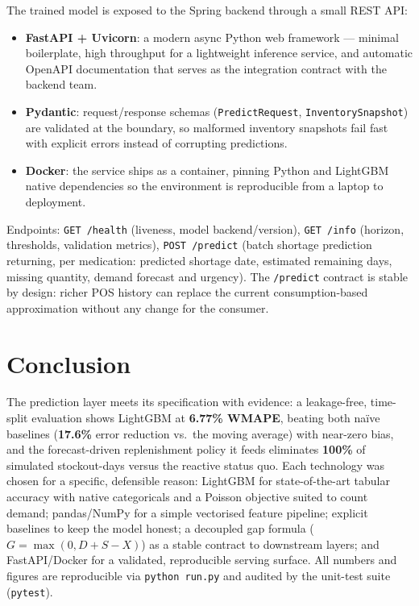 \documentclass[11pt,a4paper]{article}
\begin{document}
The trained model is exposed to the Spring backend through a small REST API:
\begin{itemize}
  \item \textbf{FastAPI + Uvicorn}: a modern async Python web framework --- minimal boilerplate, high throughput for a lightweight inference service, and automatic OpenAPI documentation that serves as the integration contract with the backend team.
  \item \textbf{Pydantic}: request/response schemas (\texttt{PredictRequest}, \texttt{InventorySnapshot}) are validated at the boundary, so malformed inventory snapshots fail fast with explicit errors instead of corrupting predictions.
  \item \textbf{Docker}: the service ships as a container, pinning Python and LightGBM native dependencies so the environment is reproducible from a laptop to deployment.
\end{itemize}
Endpoints: \texttt{GET /health} (liveness, model backend/version), \texttt{GET /info} (horizon, thresholds, validation metrics), \texttt{POST /predict} (batch shortage prediction returning, per medication: predicted shortage date, estimated remaining days, missing quantity, demand forecast and urgency). The \texttt{/predict} contract is stable by design: richer POS history can replace the current consumption-based approximation without any change for the consumer.

\section{Conclusion}

The prediction layer meets its specification with evidence: a leakage-free, time-split evaluation shows LightGBM at \textbf{6.77\% WMAPE}, beating both na\"ive baselines (\textbf{17.6\%} error reduction vs.\ the moving average) with near-zero bias, and the forecast-driven replenishment policy it feeds eliminates \textbf{100\%} of simulated stockout-days versus the reactive status quo. Each technology was chosen for a specific, defensible reason: LightGBM for state-of-the-art tabular accuracy with native categoricals and a Poisson objective suited to count demand; pandas/NumPy for a simple vectorised feature pipeline; explicit baselines to keep the model honest; a decoupled gap formula ($G = \max(0, D + S - X)$) as a stable contract to downstream layers; and FastAPI/Docker for a validated, reproducible serving surface. All numbers and figures are reproducible via \texttt{python run.py} and audited by the unit-test suite (\texttt{pytest}).
\end{document}
